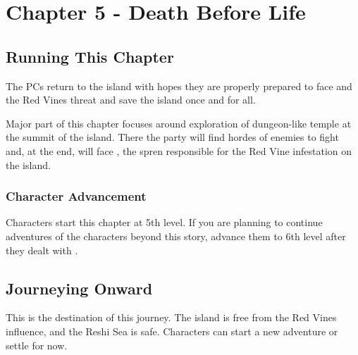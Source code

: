 \chapter{Chapter 5 - Death Before Life}

\setcounter{section}{-1}
\section{Running This Chapter}

The PCs return to the island with hopes they are properly prepared to face \npcSprenVines{} and the Red Vines threat and save the island once and for all.

Major part of this chapter focuses around exploration of dungeon-like temple at the summit of the island. There the party will find hordes of enemies to fight and, at the end, will face \npcSprenVines{}, the spren responsible for the Red Vine infestation on the island.

\subsection{Character Advancement}

Characters start this chapter at 5th level. If you are planning to continue adventures of the characters beyond this story, advance them to 6th level after they dealt with \npcSprenVines{}.








\section{Journeying Onward}

This is the destination of this journey. The island is free from the Red Vines influence, and the Reshi Sea is safe. Characters can start a new adventure or settle for now.